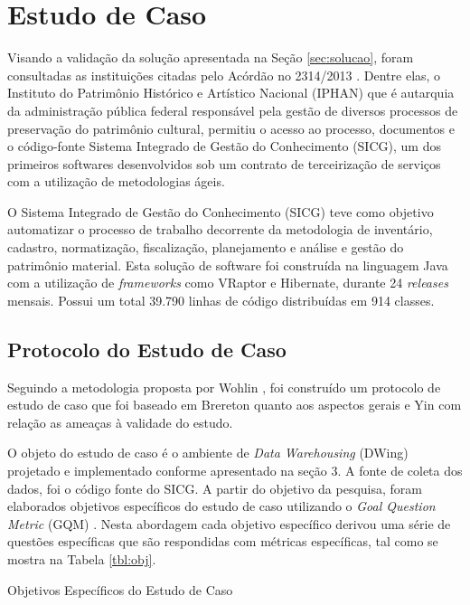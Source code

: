 \section {Estudo de Caso}

Visando a validação da solução apresentada na Seção \ref{sec:solucao}, foram consultadas as instituições citadas pelo Acórdão no 2314/2013 \cite{TCU:2013}. Dentre elas, o Instituto do Patrimônio Histórico e Artístico Nacional (IPHAN) que é autarquia da administração pública federal responsável pela gestão de diversos processos de preservação do patrimônio cultural, permitiu o acesso ao processo, documentos e o código-fonte Sistema Integrado de Gestão do Conhecimento (SICG), um dos primeiros softwares desenvolvidos sob um contrato de terceirização de serviços com a utilização de metodologias ágeis.

O Sistema Integrado de Gestão do Conhecimento (SICG) teve como objetivo automatizar o processo de trabalho decorrente da metodologia de inventário, cadastro, normatização, fiscalização, planejamento e análise e gestão do patrimônio material. Esta solução de software foi construída na linguagem Java com a utilização de \textit{frameworks} como VRaptor e Hibernate, durante 24 \textit{releases} mensais. Possui um total 39.790 linhas de código distribuídas em 914 classes.

\subsection{Protocolo do Estudo de Caso}
Seguindo a metodologia proposta por Wohlin \cite{wohlin2012experimentation}, foi construído um protocolo de estudo de caso que foi baseado em Brereton \cite{brereton2008using} quanto aos aspectos gerais e Yin \cite{yin2011applications} com relação as ameaças à validade do estudo. 

O objeto do estudo de caso é o ambiente de \textit{Data Warehousing} (DWing) projetado e implementado conforme apresentado na seção 3. A fonte de coleta dos dados, foi o código fonte do SICG. A partir do objetivo da pesquisa, foram elaborados objetivos específicos do estudo de caso utilizando o \textit{Goal Question Metric} (GQM) \cite{Basili96b}. Nesta abordagem cada objetivo específico derivou uma série de questões específicas que são respondidas com métricas específicas, tal como se mostra na Tabela \ref{tbl:obj}.

\begin{table}[ht]
\centering
\caption{Objetivos Específicos do Estudo de Caso}
\addtolength{\belowcaptionskip}{6pt}

\label{tbl:obj} 
\end{table}
\FloatBarrier



